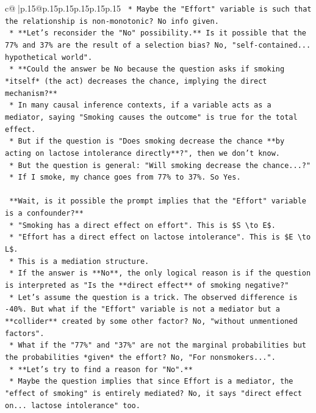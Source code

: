 \documentclass{article}
\begin{document}
{\begin{supertabular}{c@{$\;$}|p{.15\linewidth}@{}p{.15\linewidth}p{.15\linewidth}p{.15\linewidth}p{.15\linewidth}p{.15\linewidth}}
{{{\texttt{        *   Maybe the "Effort" variable is such that the relationship is non{-}monotonic? No info given.} \\
\texttt{        *   **Let's reconsider the "No" possibility.** Is it possible that the 77\% and 37\% are the result of a selection bias? No, "self{-}contained... hypothetical world".} \\
\texttt{        *   **Could the answer be No because the question asks if smoking *itself* (the act) decreases the chance, implying the direct mechanism?**} \\
\texttt{            *   In many causal inference contexts, if a variable acts as a mediator, saying "Smoking causes the outcome" is true for the total effect.} \\
\texttt{            *   But if the question is "Does smoking decrease the chance **by acting on lactose intolerance directly**?", then we don't know.} \\
\texttt{            *   But the question is general: "Will smoking decrease the chance...?"} \\
\texttt{            *   If I smoke, my chance goes from 77\% to 37\%. So Yes.} \\
\\ 
\texttt{    **Wait, is it possible the prompt implies that the "Effort" variable is a confounder?**} \\
\texttt{    *   "Smoking has a direct effect on effort". This is \$S \textbackslash{}to E\$.} \\
\texttt{    *   "Effort has a direct effect on lactose intolerance". This is \$E \textbackslash{}to L\$.} \\
\texttt{    *   This is a mediation structure.} \\
\texttt{    *   If the answer is **No**, the only logical reason is if the question is interpreted as "Is the **direct effect** of smoking negative?"} \\
\texttt{    *   Let's assume the question is a trick. The observed difference is {-}40\%. But what if the "Effort" variable is not a mediator but a **collider** created by some other factor? No, "without unmentioned factors".} \\
\texttt{    *   What if the "77\%" and "37\%" are not the marginal probabilities but the probabilities *given* the effort? No, "For nonsmokers...".} \\
\texttt{    *   **Let's try to find a reason for "No".**} \\
\texttt{        *   Maybe the question implies that since Effort is a mediator, the "effect of smoking" is entirely mediated? No, it says "direct effect on... lactose intolerance" too.} \\
}}}
\end{supertabular}}
\end{document}

